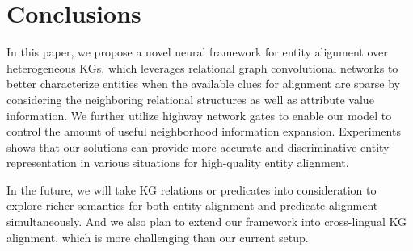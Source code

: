 
	
	\section{Conclusions}
	In this paper, we propose a novel neural framework for entity alignment over heterogeneous KGs, which leverages relational graph convolutional networks to better characterize entities when the available clues for alignment are sparse by considering the neighboring relational structures as well as attribute value information.
	We further utilize highway network gates to enable our model to control the amount of useful neighborhood information expansion. Experiments shows that our solutions can provide more accurate and discriminative entity representation in various situations for high-quality entity alignment. 
	
	In the future, we will take KG relations or predicates into consideration to explore richer
	semantics for both entity alignment and predicate alignment simultaneously. And we also plan to extend our framework into cross-lingual KG alignment, which is more challenging than our current setup. 
